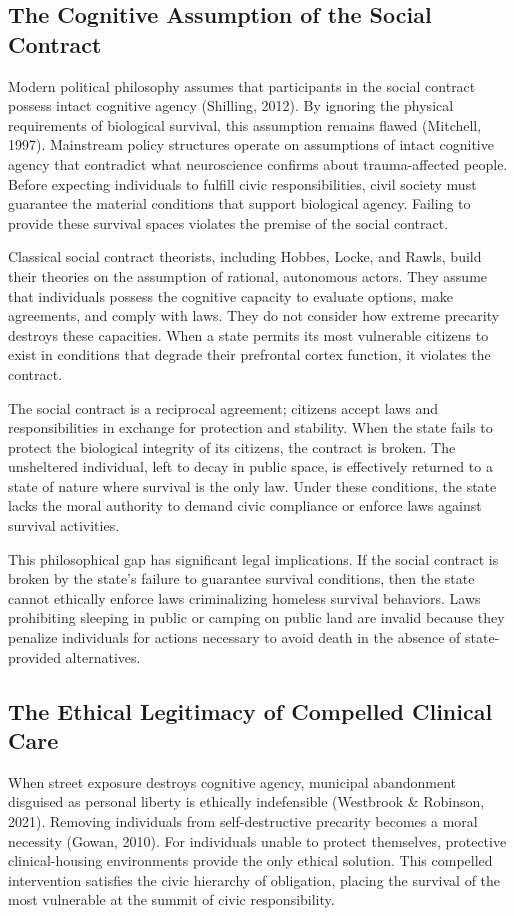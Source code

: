 \documentclass[12pt]{article}
\begin{document}
\subsection{The Cognitive Assumption of the Social Contract}
Modern political philosophy assumes that participants in the social contract possess intact cognitive agency (Shilling, 2012). By ignoring the physical requirements of biological survival, this assumption remains flawed (Mitchell, 1997). Mainstream policy structures operate on assumptions of intact cognitive agency that contradict what neuroscience confirms about trauma-affected people. Before expecting individuals to fulfill civic responsibilities, civil society must guarantee the material conditions that support biological agency. Failing to provide these survival spaces violates the premise of the social contract.

Classical social contract theorists, including Hobbes, Locke, and Rawls, build their theories on the assumption of rational, autonomous actors. They assume that individuals possess the cognitive capacity to evaluate options, make agreements, and comply with laws. They do not consider how extreme precarity destroys these capacities. When a state permits its most vulnerable citizens to exist in conditions that degrade their prefrontal cortex function, it violates the contract.

The social contract is a reciprocal agreement; citizens accept laws and responsibilities in exchange for protection and stability. When the state fails to protect the biological integrity of its citizens, the contract is broken. The unsheltered individual, left to decay in public space, is effectively returned to a state of nature where survival is the only law. Under these conditions, the state lacks the moral authority to demand civic compliance or enforce laws against survival activities.

This philosophical gap has significant legal implications. If the social contract is broken by the state's failure to guarantee survival conditions, then the state cannot ethically enforce laws criminalizing homeless survival behaviors. Laws prohibiting sleeping in public or camping on public land are invalid because they penalize individuals for actions necessary to avoid death in the absence of state-provided alternatives.

\subsection{The Ethical Legitimacy of Compelled Clinical Care}
When street exposure destroys cognitive agency, municipal abandonment disguised as personal liberty is ethically indefensible (Westbrook \& Robinson, 2021). Removing individuals from self-destructive precarity becomes a moral necessity (Gowan, 2010). For individuals unable to protect themselves, protective clinical-housing environments provide the only ethical solution. This compelled intervention satisfies the civic hierarchy of obligation, placing the survival of the most vulnerable at the summit of civic responsibility.
\end{document}
